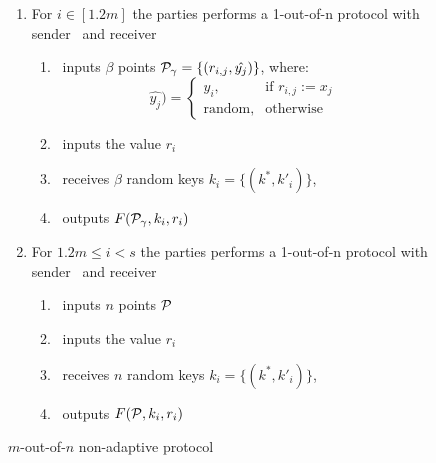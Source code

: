 \begin{figure}[h]
{\begin{minipage}{0.95\linewidth}
\begin{enumerate}
				\item For $i \in [1.2m]$  the parties performs a 1-out-of-n \OPPRF protocol with sender \SS\ and receiver \RR\
				\begin{enumerate}				
					\item \SS\ inputs $\beta$ points $\P_\gamma=\{(r_{i,j}, \hat{y_j})\}$, where:					
					\[
					\hat{y_j})= 
					\begin{cases}
					y_i,& \text{if } r_{i,j}:=x_j\\
					\text{random},              & \text{otherwise}
					\end{cases}
					\]			
						\item \RR\ inputs the value $r_i$	
					\item \SS\ receives $\beta$ random keys $k_i=\{(k^*,k'_{i})\}$, 
							
					\item \RR\ outputs $F( \P_\gamma,k_i, r_i)$
				\end{enumerate}
				
				\item For $ 1.2m \leq i < s$  the parties performs a 1-out-of-n \OPPRF protocol with sender \SS\ and receiver \RR\
				\begin{enumerate}
						\item \SS\ inputs $n$ points $\P$
						\item \RR\ inputs the value $r_i$ 
						\item \SS\ receives $n$ random keys $k_i=\{(k^*,k'_{i})\}$, 
					\item \RR\ outputs $F( \P,k_i, r_i)$	
				\end{enumerate}
				
			\end{enumerate}				
		\end{minipage}
	}
	\caption{$m$-out-of-$n$ non-adaptive \OPPRF protocol}
	\label{fig:Consnssot}
\end{figure}

\begin{table}\centering
	
	\caption{ Parameters used in . $n$ is the size of the parties' input sets; $\beta$ is the maximum bin size for simple hashing; $s$ is the maximum hash size for Cuckoo hashing}
	\label{tbl:params}
\end{table}

